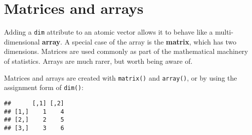 \hypertarget{matrices-and-arrays}{%
\section{Matrices and arrays}\label{matrices-and-arrays}}

Adding a \texttt{dim} attribute to an atomic vector allows it to behave
like a multi-dimensional \textbf{array}. A special case of the array is
the \textbf{matrix}, which has two dimensions. Matrices are used
commonly as part of the mathematical machinery of statistics. Arrays are
much rarer, but worth being aware of. 

Matrices and arrays are created with \texttt{matrix()} and
\texttt{array()}, or by using the assignment form of \texttt{dim()}:

\begin{Shaded}
\begin{Highlighting}[]
\StringTok{ }\NormalTok{(}\OperatorTok{:}\NormalTok{, } \NormalTok{, } \NormalTok{)}
\StringTok{ }\NormalTok{(}\OperatorTok{:}\NormalTok{, }\NormalTok{(}\NormalTok{, }\NormalTok{, }\NormalTok{))}

\StringTok{ }\OperatorTok{:}
\StringTok{ }\NormalTok{(}\NormalTok{, }\NormalTok{)}
\end{Highlighting}
\end{Shaded}

\begin{verbatim}
##      [,1] [,2]
## [1,]    1    4
## [2,]    2    5
## [3,]    3    6
\end{verbatim}

\begin{Shaded}
\begin{Highlighting}[]
\StringTok{ }\NormalTok{(}\NormalTok{, }\NormalTok{)}
\end{Highlighting}
\end{Shaded}

